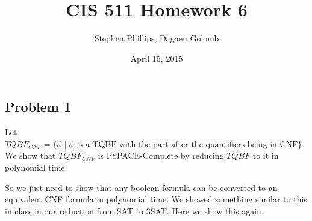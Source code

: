 \documentclass[english]{article}
\title{CIS 511 Homework 6}
\author{Stephen Phillips, Dagaen Golomb}
\date{April 15, 2015}
\begin{document}
\maketitle
\subsection*{Problem 1}
Let $TQBF_{CNF} = \{ \phi \mid \phi \textrm{ is a TQBF with the part after the quantifiers being in CNF} \}$. We show
that $TQBF_{CNF}$ is PSPACE-Complete by reducing $TQBF$ to it in polynomial time.


So we just need to show that any boolean formula can be converted to an equivalent CNF formula in polynomial time.
We showed something similar to this in class in our reduction from SAT to 3SAT. Here we show this again.
\end{document}
